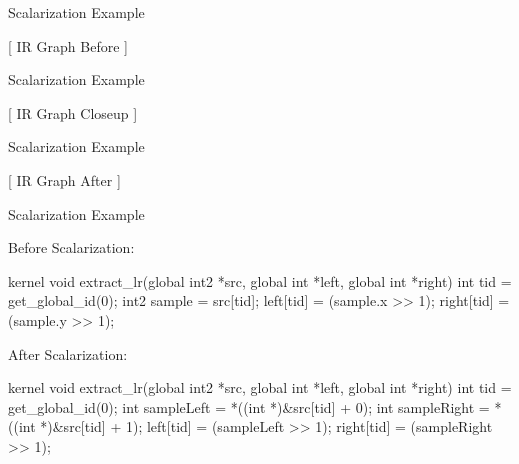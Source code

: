 
\begin{frame}{Scalarization Example}

[ IR Graph Before ]

\end{frame}


\begin{frame}{Scalarization Example}

[ IR Graph Closeup ]

\end{frame}


\begin{frame}{Scalarization Example}

[ IR Graph After ]

\end{frame}


\begin{frame}[fragile]{Scalarization Example}

Before Scalarization:
\begin{codebox}
kernel void extract_lr(global int2 *src, global int *left, global int *right) {
    int tid = get_global_id(0);
    int2 sample = src[tid];
    left[tid] = (sample.x >> 1);
    right[tid] = (sample.y >> 1);
}
\end{codebox}

After Scalarization:
\begin{codebox}
kernel void extract_lr(global int2 *src, global int *left, global int *right) {
    int tid = get_global_id(0);
    int sampleLeft = *((int *)&src[tid] + 0);
    int sampleRight = *((int *)&src[tid] + 1);
    left[tid] = (sampleLeft >> 1);
    right[tid] = (sampleRight >> 1);
}
\end{codebox}

\end{frame}


